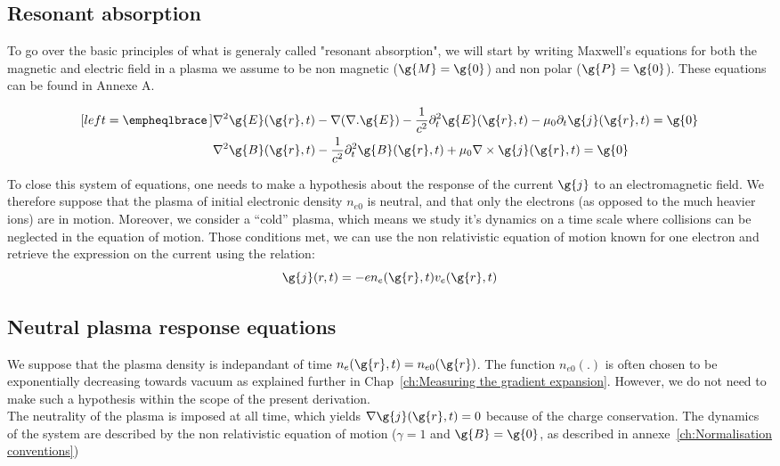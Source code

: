 \subsection{Resonant absorption}

To go over the basic principles of what is generaly called "resonant absorption", we will start by writing Maxwell's equations for both the magnetic and electric field in a plasma we assume to be non magnetic ($\g{M}=\g{0}$) and non polar ($\g{P}=\g{0}$). These equations can be found in Annexe A.

\begin{subequations}
\label{eq:EandBequations}
\begin{align}[left = \empheqlbrace\,]
&\nabla^2 \g{E}(\g{r},t)  - \nabla ( \nabla. \g{E})  - \frac{1}{c^2} \partial_{t}^2 \g{E}(\g{r},t)  -\mu_0\partial_t \g{j}(\g{r},t) = \g{0}  \label{eq:Eequations}\\
&\nabla^2 \g{B}(\g{r},t) - \frac{1}{c^2}\partial_{t}^2 \g{B}(\g{r},t)  + \mu_0\nabla \times \g{j}(\g{r},t) =\g{0} \label{eq:Bequations} 
\end{align}
\end{subequations}

\noindent To close this system of equations, one needs to make a hypothesis about the response of the current $\g{j}$ to an electromagnetic field. We therefore suppose that the plasma of initial electronic density $n_{e0}$ is neutral, and that only the electrons (as opposed to the much heavier ions) are in motion. Moreover, we consider a ``cold'' plasma, which means we study it's dynamics on a time scale where collisions can be neglected in the equation of motion. Those conditions met, we can use the non relativistic equation of motion known for one electron and retrieve the expression on the current using the relation:
$$
\g{j}(r,t) = -en_e(\g{r},t) v_e(\g{r},t)
$$

\subsection{Neutral plasma response equations}

We suppose that the plasma density is indepandant of time $n_e(\g{r},t) = n_{e0}(\g{r})$. The function $n_{e0}(.)$ is often chosen to be exponentially decreasing towards vacuum as explained further in Chap~\ref{ch:Measuring the gradient expansion}. However, we do not need to make such a hypothesis within the scope of the present derivation.\\
The neutrality of the plasma is imposed at all time, which yields $\nabla \g{j}(\g{r},t) = 0$ because of the charge conservation. The dynamics of the system are described by the non relativistic equation of motion ($\gamma =1$ and $\g{B}=\g{0}$, as described in annexe~\ref{ch:Normalisation conventions})

